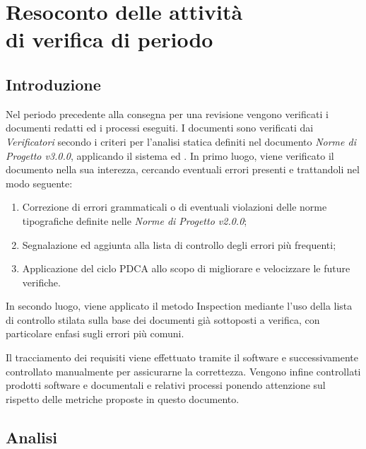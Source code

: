 \documentclass[openany,12pt,a4paper]{report}
\begin{document}

\chapter{Resoconto delle attività \\ di verifica di periodo}

\section{Introduzione}

Nel periodo precedente alla consegna per una revisione vengono verificati i documenti redatti ed i processi eseguiti. I documenti sono verificati dai \textit{Verificatori} secondo i criteri per l'analisi statica definiti nel documento \textit{Norme di Progetto v3.0.0}, applicando il sistema  ed . In primo luogo, viene verificato il documento nella sua interezza, cercando eventuali errori presenti e trattandoli nel modo seguente:

\begin{enumerate}
	\item Correzione di errori grammaticali o di eventuali violazioni delle norme tipografiche definite nelle \textit{Norme di Progetto v2.0.0};
	\item Segnalazione ed aggiunta alla lista di controllo degli errori più frequenti;
	\item Applicazione del ciclo PDCA allo scopo di migliorare e velocizzare le future verifiche.
\end{enumerate}

\noindent In secondo luogo, viene applicato il metodo Inspection mediante l'uso della lista di controllo stilata sulla base dei documenti già sottoposti a verifica, con particolare enfasi sugli errori più comuni.

\noindent Il tracciamento dei requisiti viene effettuato tramite il software  e successivamente controllato manualmente per assicurarne la correttezza.
Vengono infine controllati prodotti software e documentali e relativi processi ponendo attenzione sul rispetto delle metriche proposte in questo documento.


\section{Analisi}
\end{document}
